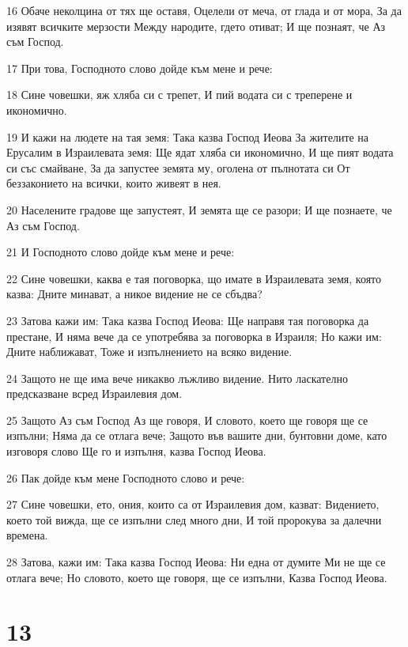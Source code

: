 \par 16 Обаче неколцина от тях ще оставя, Оцелели от меча, от глада и от мора, За да изявят всичките мерзости Между народите, гдето отиват; И ще познаят, че Аз съм Господ.
\par 17 При това, Господното слово дойде към мене и рече:
\par 18 Сине човешки, яж хляба си с трепет, И пий водата си с треперене и икономично.
\par 19 И кажи на людете на тая земя: Така казва Господ Иеова За жителите на Ерусалим в Израилевата земя: Ще ядат хляба си икономично, И ще пият водата си със смайване, За да запустее земята му, оголена от пълнотата си От беззаконието на всички, които живеят в нея.
\par 20 Населените градове ще запустеят, И земята ще се разори; И ще познаете, че Аз съм Господ.
\par 21 И Господното слово дойде към мене и рече:
\par 22 Сине човешки, каква е тая поговорка, що имате в Израилевата земя, която казва: Дните минават, а никое видение не се сбъдва?
\par 23 Затова кажи им: Така казва Господ Иеова: Ще направя тая поговорка да престане, И няма вече да се употребява за поговорка в Израиля; Но кажи им: Дните наближават, Тоже и изпълнението на всяко видение.
\par 24 Защото не ще има вече никакво лъжливо видение. Нито ласкателно предсказване всред Израилевия дом.
\par 25 Защото Аз съм Господ Аз ще говоря, И словото, което ще говоря ще се изпълни; Няма да се отлага вече; Защото във вашите дни, бунтовни доме, като изговоря слово Ще го и изпълня, казва Господ Иеова.
\par 26 Пак дойде към мене Господното слово и рече:
\par 27 Сине човешки, ето, ония, които са от Израилевия дом, казват: Видението, което той вижда, ще се изпълни след много дни, И той пророкува за далечни времена.
\par 28 Затова, кажи им: Така казва Господ Иеова: Ни една от думите Ми не ще се отлага вече; Но словото, което ще говоря, ще се изпълни, Казва Господ Иеова.

\chapter{13}

